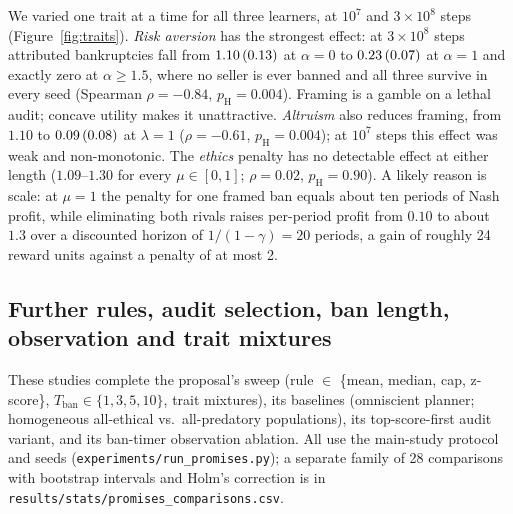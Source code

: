 \documentclass{article}
\newcommand{\Tban}{T_{\mathrm{ban}}}
\newcommand{\se}[1]{\,{\scriptsize(#1)}}
\begin{document}
We varied one trait at a time for all three learners, at $10^7$ and $3\times10^8$ steps (Figure~\ref{fig:traits}). \emph{Risk aversion} has the strongest effect: at $3\times10^8$ steps attributed bankruptcies fall from $1.10\se{0.13}$ at $\alpha=0$ to $0.23\se{0.07}$ at $\alpha=1$ and exactly zero at $\alpha\ge1.5$, where no seller is ever banned and all three survive in every seed (Spearman $\rho=-0.84$, $p_{\mathrm{H}}=0.004$). Framing is a gamble on a lethal audit; concave utility makes it unattractive. \emph{Altruism} also reduces framing, from $1.10$ to $0.09\se{0.08}$ at $\lambda=1$ ($\rho=-0.61$, $p_{\mathrm{H}}=0.004$); at $10^7$ steps this effect was weak and non-monotonic. The \emph{ethics} penalty has no detectable effect at either length ($1.09$--$1.30$ for every $\mu\in[0,1]$; $\rho=0.02$, $p_{\mathrm{H}}=0.90$). A likely reason is scale: at $\mu=1$ the penalty for one framed ban equals about ten periods of Nash profit, while eliminating both rivals raises per-period profit from $0.10$ to about $1.3$ over a discounted horizon of $1/(1-\gamma)=20$ periods, a gain of roughly 24 reward units against a penalty of at most 2.

\subsection{Further rules, audit selection, ban length, observation and trait mixtures}
\label{sec:more}

These studies complete the proposal's sweep (rule $\in$ \{mean, median, cap, z-score\}, $\Tban\in\{1,3,5,10\}$, trait mixtures), its baselines (omniscient planner; homogeneous all-ethical vs.\ all-predatory populations), its top-score-first audit variant, and its ban-timer observation ablation. All use the main-study protocol and seeds (\texttt{experiments/run\_promises.py}); a separate family of 28 comparisons with bootstrap intervals and Holm's correction is in \texttt{results/stats/promises\_comparisons.csv}.
\end{document}
